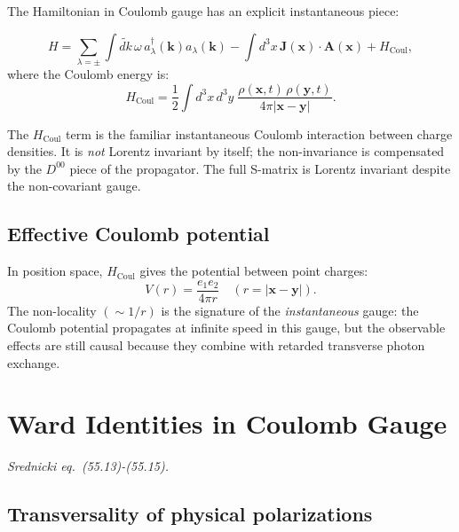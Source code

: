 The Hamiltonian in Coulomb gauge has an explicit instantaneous piece:

\begin{mdframed}[backgroundcolor=blue!5]
\begin{equation}\label{eq:coulomb-hamiltonian}
  H = \sum_{\lambda=\pm}\int\!\widetilde{dk}\,\omega\, a^\dagger_\lambda(\mathbf{k})a_\lambda(\mathbf{k})
    - \int d^3x\,\mathbf{J}(\mathbf{x})\cdot\mathbf{A}(\mathbf{x})
    + H_\text{Coul},
\end{equation}
where the Coulomb energy is:
\begin{equation}\label{eq:coulomb-energy}
  H_\text{Coul} = \frac{1}{2}\int d^3x\,d^3y\;
  \frac{\rho(\mathbf{x},t)\,\rho(\mathbf{y},t)}{4\pi|\mathbf{x}-\mathbf{y}|}.
\end{equation}
\end{mdframed}

The $H_\text{Coul}$ term is the familiar instantaneous Coulomb interaction between
charge densities.  It is \emph{not} Lorentz invariant by itself; the non-invariance
is compensated by the $D^{00}$ piece of the propagator.  The full S-matrix is Lorentz
invariant despite the non-covariant gauge.

\subsection{Effective Coulomb potential}

In position space, $H_\text{Coul}$ gives the potential between point charges:
\begin{equation}
  V(r) = \frac{e_1 e_2}{4\pi r} \quad (r = |\mathbf{x}-\mathbf{y}|).
\end{equation}
The non-locality $(\sim 1/r)$ is the signature of the \emph{instantaneous} gauge:
the Coulomb potential propagates at infinite speed in this gauge, but the
observable effects are still causal because they combine with retarded transverse
photon exchange.

\section{Ward Identities in Coulomb Gauge}

\textit{Srednicki eq.\ (55.13)-(55.15).}

\subsection{Transversality of physical polarizations}

